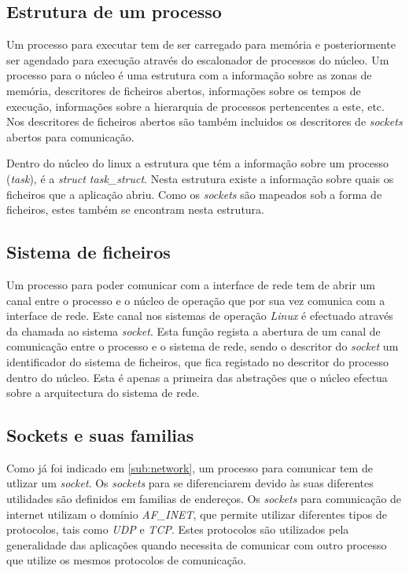 
\subsection{Estrutura de um processo}

Um processo para executar tem de ser carregado para memória e posteriormente ser agendado para execução através do escalonador de processos do núcleo.
 Um processo para o núcleo é uma estrutura com a informação sobre as zonas de memória, descritores de ficheiros abertos, informações sobre os tempos de execução, informações sobre a hierarquia de processos pertencentes a este, etc.
 Nos descritores de ficheiros abertos são também incluidos os descritores de \textit{sockets} abertos para comunicação. 

 Dentro do núcleo do linux a estrutura que tém a informação sobre um processo (\textit{task}), é a \textit{struct task\_struct}. 
 Nesta estrutura existe a informação sobre quais os ficheiros que a aplicação abriu.
 Como os \textit{sockets} são mapeados sob a forma de ficheiros, estes também se encontram nesta estrutura.

\subsection{Sistema de ficheiros}

Um processo para poder comunicar com a interface de rede tem de abrir um canal entre o processo e o núcleo de operação que por sua vez comunica com a interface de rede.
 Este canal nos sistemas de operação \textit{Linux} é efectuado através da chamada ao sistema \textit{socket}.
 Esta função regista a abertura de um canal de comunicação entre o processo e o sistema de rede, sendo o descritor do \textit{socket} um identificador do sistema de ficheiros, que fica registado no descritor do processo dentro do núcleo.
 Esta é apenas a primeira das abstrações que o núcleo efectua sobre a arquitectura do sistema de rede.
  


\subsection{Sockets e suas familias}
\label{sub:af_inet}

Como já foi indicado em \ref{sub:network}, um processo para comunicar tem de utlizar um \textit{socket}.
 Os \textit{sockets} para se diferenciarem devido às suas diferentes utilidades são definidos em  familias de endereços.
 Os \textit{sockets} para comunicação de internet utilizam o domínio \textit{AF\_INET}, que permite utilizar diferentes tipos de protocolos, tais como \textit{UDP} e \textit{TCP}.
 Estes protocolos são utilizados pela generalidade das aplicações quando necessita de comunicar com outro processo que utilize os mesmos protocolos de comunicação.

